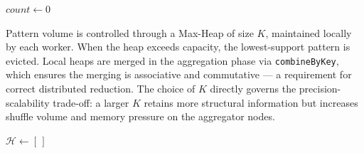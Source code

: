 \documentclass[10pt, twocolumn]{article}
\begin{document}
\begin{algorithm}[H]
    \caption{\textsc{TopKCombinations} — binary enumeration}

    $count \leftarrow 0$\;
\end{algorithm}


Pattern volume is controlled through a Max-Heap of size $K$, maintained
locally by each worker. When the heap exceeds capacity, the lowest-support
pattern is evicted. Local heaps are merged in the aggregation phase via
\texttt{combineByKey}, which ensures the merging is associative and commutative
— a requirement for correct distributed reduction. The choice of $K$ directly
governs the precision-scalability trade-off: a larger $K$ retains more
structural information but increases shuffle volume and memory pressure on the
aggregator nodes.

\begin{algorithm}[H]
    \caption{Local Top-$K$ FP-Growth}

    $\mathcal{H} \leftarrow [\,]$\;
    \;
\end{algorithm}
\end{document}
